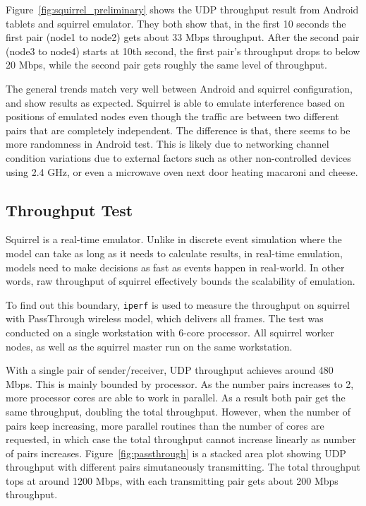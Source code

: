 \documentclass[12pt]{report}
\begin{document}
Figure~\ref{fig:squirrel_preliminary} shows the UDP throughput result from Android tablets and squirrel emulator. They both show that, in the first 10 seconds the first pair (node1 to node2) gets about 33 Mbps throughput. After the second pair (node3 to node4) starts at 10th second, the first pair's throughput drops to below 20 Mbps, while the second pair gets roughly the same level of throughput.

The general trends match very well between Android and squirrel configuration, and show results as expected. Squirrel is able to emulate interference based on positions of emulated nodes even though the traffic are between two different pairs that are completely independent. The difference is that, there seems to be more randomness in Android test. This is likely due to networking channel condition variations due to external factors such as other non-controlled devices using 2.4 GHz, or even a microwave oven next door heating macaroni and cheese.

\subsection{Throughput Test}

Squirrel is a real-time emulator. Unlike in discrete event simulation where the model can take as long as it needs to calculate results, in real-time emulation, models need to make decisions as fast as events happen in real-world. In other words, raw throughput of squirrel effectively bounds the scalability of emulation.

To find out this boundary, \texttt{iperf} is used to measure the throughput on squirrel with PassThrough wireless model, which delivers all frames. The test was conducted on a single workstation with 6-core processor. All squirrel worker nodes, as well as the squirrel master run on the same workstation.

With a single pair of sender/receiver, UDP throughput achieves around 480 Mbps. This is mainly bounded by processor. As the number pairs increases to 2, more processor cores are able to work in parallel. As a result both pair get the same throughput, doubling the total throughput. However, when the number of pairs keep increasing, more parallel routines than the number of cores are requested, in which case the total throughput cannot increase linearly as number of pairs increases. Figure~\ref{fig:passthrough} is a stacked area plot showing UDP throughput with different pairs simutaneously transmitting. The total throughput tops at around 1200 Mbps, with each transmitting pair gets about 200 Mbps throughput.
\end{document}
